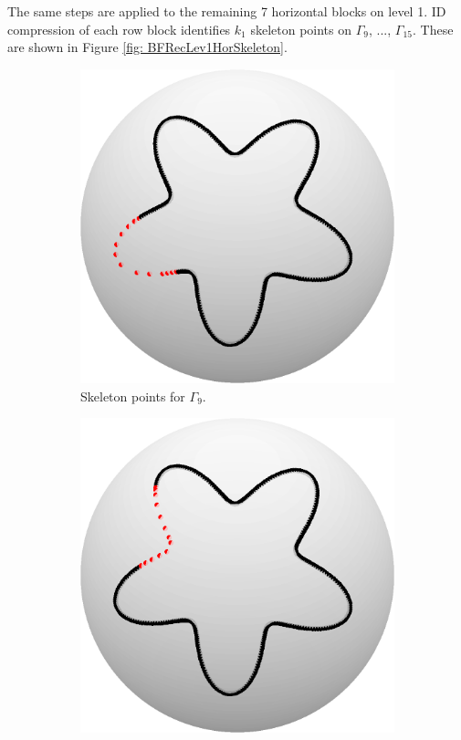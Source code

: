 \documentclass{sfuthesis}
\begin{document}
The same steps are applied to the remaining 7 horizontal blocks on level 1. ID compression of each row block identifies $k_1$ skeleton points on $\Gamma_9$, ..., $\Gamma_{15}$. These are shown in Figure \ref{fig: BFRecLev1HorSkeleton}.
\begin{figure}[h]
	\centering
  	\begin{subfigure}[b]{0.24\textwidth}
  	\captionsetup{justification=centering}
    		\includegraphics[width=\textwidth]{BFRecLev1HorSkel9}
    		\caption{Skeleton points for $\Gamma_9$.} 
       \end{subfigure}
       \quad
       \begin{subfigure}[b]{0.24\textwidth}
       \captionsetup{justification=centering}
      		\includegraphics[width=\textwidth]{BFRecLev1HorSkel10}

\end{subfigure}
\end{figure}
\end{document}
